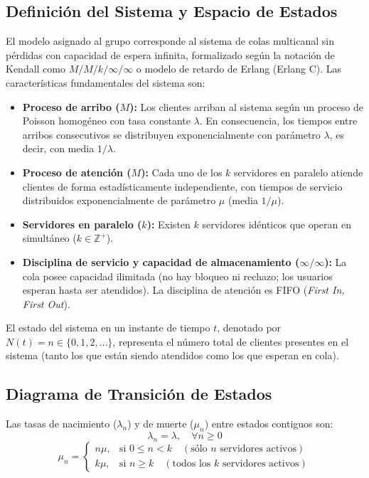\documentclass[11pt, a4paper]{article}
\begin{document}
\subsection{Definición del Sistema y Espacio de Estados}
El modelo asignado al grupo corresponde al sistema de colas multicanal sin pérdidas con capacidad de espera infinita, formalizado según la notación de Kendall como $M/M/k/\infty/\infty$ o modelo de retardo de Erlang (Erlang C). Las características fundamentales del sistema son:
\begin{itemize}
    \item \textbf{Proceso de arribo ($M$):} Los clientes arriban al sistema según un proceso de Poisson homogéneo con tasa constante $\lambda$. En consecuencia, los tiempos entre arribos consecutivos se distribuyen exponencialmente con parámetro $\lambda$, es decir, con media $1/\lambda$.
    \item \textbf{Proceso de atención ($M$):} Cada uno de los $k$ servidores en paralelo atiende clientes de forma estadísticamente independiente, con tiempos de servicio distribuidos exponencialmente de parámetro $\mu$ (media $1/\mu$).
    \item \textbf{Servidores en paralelo ($k$):} Existen $k$ servidores idénticos que operan en simultáneo ($k \in \mathbb{Z}^+$).
    \item \textbf{Disciplina de servicio y capacidad de almacenamiento ($\infty/\infty$):} La cola posee capacidad ilimitada (no hay bloqueo ni rechazo; los usuarios esperan hasta ser atendidos). La disciplina de atención es FIFO (\textit{First In, First Out}).
\end{itemize}

El estado del sistema en un instante de tiempo $t$, denotado por $N(t) = n \in \{0, 1, 2, \dots\}$, representa el número total de clientes presentes en el sistema (tanto los que están siendo atendidos como los que esperan en cola).

\subsection{Diagrama de Transición de Estados}
Las tasas de nacimiento ($\lambda_n$) y de muerte ($\mu_n$) entre estados contiguos son:
\begin{equation}
\lambda_n = \lambda, \quad \forall n \ge 0
\end{equation}
\begin{equation}
\mu_n = 
\begin{cases} 
n\mu, & \text{si } 0 \le n < k \quad (\text{sólo } n \text{ servidores activos}) \\
k\mu, & \text{si } n \ge k \quad (\text{todos los } k \text{ servidores activos})
\end{cases}
\end{equation}
\end{document}
